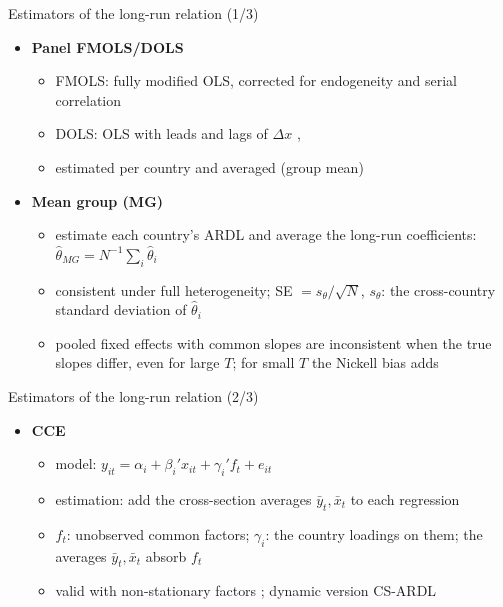 \begin{frame}{Estimators of the long-run relation (1/3)}
\itemsize{\small}
\begin{itemize}
    \item \textbf{Panel FMOLS/DOLS} 
    \begin{itemize}
        \item FMOLS: fully modified OLS, corrected for endogeneity and serial correlation 
        \item DOLS: OLS with leads and lags of $\Delta x$ , 
        \item estimated per country and averaged (group mean)
    \end{itemize}
    \item \textbf{Mean group (MG)} 
    \begin{itemize}
        \item estimate each country's ARDL and average the long-run coefficients: $\hat\theta_{MG} = N^{-1}\sum_i\hat\theta_i$
        \item consistent under full heterogeneity; SE $= s_\theta/\sqrt N$, $s_\theta$: the cross-country standard deviation of $\hat\theta_i$
        \item pooled fixed effects with common slopes are inconsistent when the true slopes differ, even for large $T$; for small $T$ the Nickell bias adds 
    \end{itemize}
\end{itemize}
\end{frame}

\begin{frame}{Estimators of the long-run relation (2/3)}
\itemsize{\small}
\begin{itemize}
    \item \textbf{CCE} 
    \begin{itemize}
        \item model: $y_{it} = \alpha_i + \beta_i'x_{it} + \gamma_i'f_t + e_{it}$
        \item estimation: add the cross-section averages $\bar y_t, \bar x_t$ to each regression
        \item $f_t$: unobserved common factors; $\gamma_i$: the country loadings on them; the averages $\bar y_t, \bar x_t$ absorb $f_t$
        \item valid with non-stationary factors ; dynamic version CS-ARDL 
    \end{itemize}
\end{itemize}
\end{frame}

